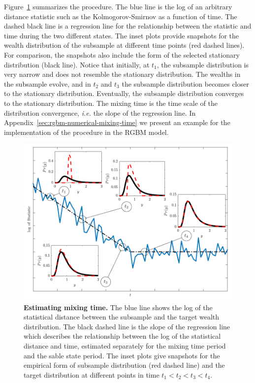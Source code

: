 \documentclass[11pt]{article}
\newcommand{\ie}{{\it i.e.}\xspace}
\newcommand{\Fref}[1]{Figure~\ref{fig:#1}}
\numberwithin{equation}{section}
\begin{document}
\Fref{mixing-time} summarizes the procedure. The blue line is the log of an arbitrary distance statistic such as the Kolmogorov-Smirnov as a function of time. The dashed black line is a regression line for the relationship between the statistic and time during the two different states. The inset plots provide snapshots for the wealth distribution of the subsample at different time points (red dashed lines). For comparison, the snapshots also include the form of the selected stationary distribution (black line). Notice that initially, at $t_1$, the subsample distribution is very narrow and does not resemble the stationary distribution. The wealths in the subsample evolve, and in $t_2$ and $t_3$ the subsample distribution becomes closer to the stationary distribution. Eventually, the subsample distribution converges to the stationary distribution. The mixing time is the time scale of the distribution convergence, \ie the slope of the regression line. In Appendix~\ref{sec:rgbm-numerical-mixing-time} we present an example for the implementation of the procedure in the RGBM model.

\begin{figure}[!htb]
\centering
\includegraphics[width=1.0\textwidth]{figs/fig_mixing_time.pdf}
\caption{\textbf{Estimating mixing time.} The blue line shows the log of the statistical distance between the subsample and the target wealth distribution. The black dashed line is the slope of the regression line which describes the relationship between the log of the statistical distance and time, estimated separately for the mixing time period and the sable state period. The inset plots give snapshots for the empirical form of subsample distribution (red dashed line) and the target distribution at different points in time $t_1 < t_2 < t_3 < t_4$.
\label{fig:mixing-time}}
\end{figure}
\FloatBarrier
\end{document}
